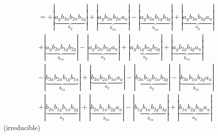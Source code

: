 \documentclass{article}
\begin{document}
\begin{multline*}
\end{multline*}\begin{multline*}
=+\left|\underbrace{a_{g} b_{3u} b_{2u} b_{1g}}_{a_{g}}\right|+\left|\underbrace{a_{g} b_{3u} b_{2u} a_{u}}_{b_{1u}}\right|-\left|\underbrace{a_{g} b_{3u} b_{1g} b_{3g}}_{b_{1u}}\right|+\left|\underbrace{a_{g} b_{3u} b_{3g} a_{u}}_{a_{g}}\right|\\
+\left|\underbrace{a_{g} b_{2u} b_{1g} b_{2g}}_{b_{1u}}\right|-\left|\underbrace{a_{g} b_{2u} b_{2g} a_{u}}_{a_{g}}\right|+\left|\underbrace{a_{g} b_{1g} b_{2g} b_{3g}}_{a_{g}}\right|+\left|\underbrace{a_{g} b_{2g} b_{3g} a_{u}}_{b_{1u}}\right|\\
-\left|\underbrace{b_{3u} b_{2u} b_{1g} b_{1u}}_{b_{1u}}\right|+\left|\underbrace{b_{3u} b_{2u} b_{1u} a_{u}}_{a_{g}}\right|-\left|\underbrace{b_{3u} b_{1g} b_{1u} b_{3g}}_{a_{g}}\right|-\left|\underbrace{b_{3u} b_{1u} b_{3g} a_{u}}_{b_{1u}}\right|\\
+\left|\underbrace{b_{2u} b_{1g} b_{1u} b_{2g}}_{a_{g}}\right|+\left|\underbrace{b_{2u} b_{1u} b_{2g} a_{u}}_{b_{1u}}\right|-\left|\underbrace{b_{1g} b_{1u} b_{2g} b_{3g}}_{b_{1u}}\right|+\left|\underbrace{b_{1u} b_{2g} b_{3g} a_{u}}_{a_{g}}\right|
\end{multline*}(irreducible)\\ \\
\vspace{0.5cm}
\end{document}
